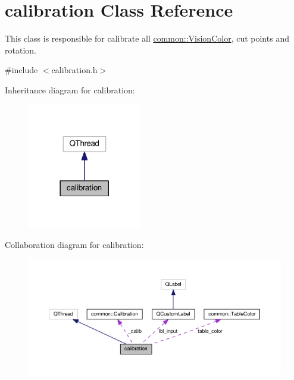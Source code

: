 \hypertarget{classcalibration}{}\section{calibration Class Reference}
\label{classcalibration}


This class is responsible for calibrate all \hyperlink{structcommon_1_1VisionColor}{common\+::\+Vision\+Color}, cut points and rotation.  




{\ttfamily \#include $<$calibration.\+h$>$}



Inheritance diagram for calibration\+:
\nopagebreak
\begin{figure}[H]
\begin{center}
\leavevmode
\includegraphics[width=141pt]{classcalibration__inherit__graph}
\end{center}
\end{figure}


Collaboration diagram for calibration\+:
\nopagebreak
\begin{figure}[H]
\begin{center}
\leavevmode
\includegraphics[width=350pt]{classcalibration__coll__graph}
\end{center}
\end{figure}
